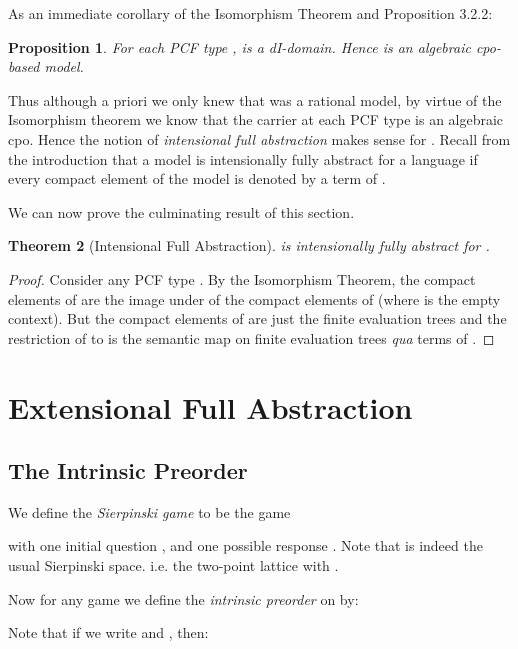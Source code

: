 \documentclass[11pt]{article}
\newtheorem{theorem}{Theorem}[section]
\newtheorem{proposition}[theorem]{Proposition}
\begin{document}
As an immediate corollary of the Isomorphism Theorem and Proposition
3.2.2:
\begin{proposition}
For each PCF type ,  is a dI-domain. Hence 
is an algebraic cpo-based model.
\end{proposition}
Thus although a priori we only knew that  was a rational
model, by virtue of the Isomorphism theorem we know that the carrier
at each PCF type is an algebraic cpo. Hence the notion of {\em
  intensional full abstraction} makes sense for . Recall
from the introduction that a model is intensionally fully abstract for a
language  if every compact element of the model is denoted by
a term of .

We can now prove the culminating result of this section.

\begin{theorem}[Intensional Full Abstraction]

 is intensionally fully abstract for .
\end{theorem}
\begin{proof} Consider any PCF type . By the Isomorphism Theorem,
the compact elements of  are the image under  of the compact elements of 
(where  is the empty context). But the compact elements
of  are just the finite evaluation trees
 and the restriction of  to  is the semantic map  on finite evaluation trees {\sl qua} terms of .
\end{proof}

\section{Extensional Full Abstraction}
\newcommand{\converges}{{\downarrow}}
\newcommand{\Converges}{{\Downarrow}}
\newcommand{\diverges}{{\uparrow}}
\newcommand{\Siepinski}{{\Sigma}}
\subsection{The Intrinsic Preorder}

We define the {\em Sierpinski game}  to be the game

with one initial question , and one possible response . Note
that   is indeed the usual Sierpinski space. i.e. the
two-point lattice  with .

Now for any game  we define the {\em intrinsic preorder}  on
 by:

Note that if we write  and , then:
\end{document}
